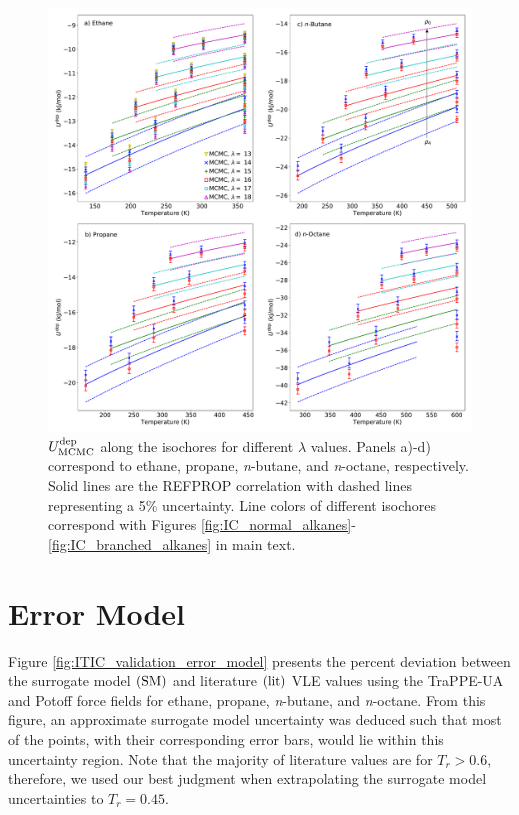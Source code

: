 \documentclass[journal=jctc,manuscript=article]{achemso}
\begin{document}
\begin{figure}[p!]
	\centering
	\includegraphics[width=6.4in]{MCMC_Mie_UIC_alkanes}
	\caption{$U^{\rm dep}_{\rm MCMC}$ along the isochores for different $\lambda$ values. Panels a)-d) correspond to ethane, propane, \textit{n}-butane, and \textit{n}-octane, respectively. Solid lines are the REFPROP correlation with dashed lines representing a 5\% uncertainty. Line colors of different isochores correspond with Figures \ref{fig:IC_normal_alkanes}-\ref{fig:IC_branched_alkanes} in main text.}
	\label{fig:MCMC_Mie_UIC_alkanes}
\end{figure} 

\newpage

\section{Error Model} \label{Error Model}

Figure \ref{fig:ITIC_validation_error_model} presents the percent deviation between the surrogate model $(\rm SM)$ and literature $(\rm lit)$ VLE values using the TraPPE-UA and Potoff force fields for ethane, propane, \textit{n}-butane, and \textit{n}-octane. From this figure, an approximate surrogate model uncertainty was deduced such that most of the points, with their corresponding error bars, would lie within this uncertainty region. Note that the majority of literature values are for $T_r > 0.6$, therefore, we used our best judgment when extrapolating the surrogate model uncertainties to $T_r = 0.45$. 
\end{document}
